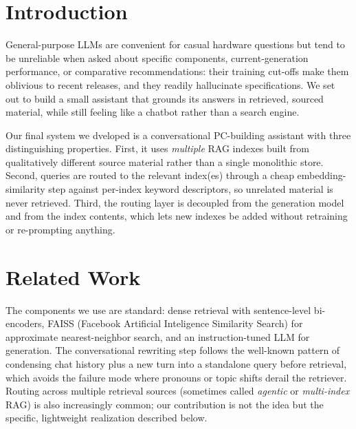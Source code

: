 \documentclass[fleqn,moreauthors,10pt]{ds_report}
\affiliation{\textit{Advisors: Aleš Žagar}}
\begin{document}
\flushbottom 

\maketitle 

\thispagestyle{empty} 


\section*{Introduction}

General-purpose LLMs\cite{naveed2025comprehensive} are convenient for casual hardware questions but tend to be unreliable when asked about specific components, current-generation performance, or comparative recommendations: their training cut-offs make them oblivious to recent releases, and they readily hallucinate specifications. We set out to build a small assistant that grounds its answers in retrieved, sourced material, while still feeling like a chatbot rather than a search engine.
 
Our final system we dveloped is a conversational PC-building assistant with three distinguishing properties. First, it uses \emph{multiple} RAG\cite{lewis2020rag} indexes built from qualitatively different source material rather than a single monolithic store. Second, queries are routed to the relevant index(es) through a cheap embedding-similarity step against per-index keyword descriptors, so unrelated material is never retrieved. Third, the routing layer is decoupled from the generation model and from the index contents, which lets new indexes be added without retraining or re-prompting anything.

\section*{Related Work}
 
The components we use are standard: dense retrieval with sentence-level bi-encoders, FAISS\cite{krisnawati2024indonesian} (Facebook Artificial Inteligence Similarity Search) for approximate nearest-neighbor search, and an instruction-tuned LLM for generation. The conversational rewriting step follows the well-known pattern of condensing chat history plus a new turn into a standalone query before retrieval, which avoids the failure mode where pronouns or topic shifts derail the retriever. Routing across multiple retrieval sources (sometimes called \emph{agentic} or \emph{multi-index} RAG\cite{singh2025agentic}) is also increasingly common; our contribution is not the idea but the specific, lightweight realization described below.
\end{document}
